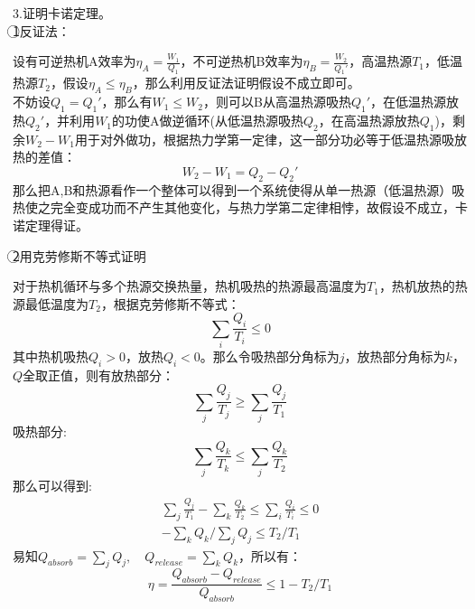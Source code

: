\documentclass[12pt]{article}
\begin{document}
\noindent
3.证明卡诺定理。\\
\textcircled{1}反证法：

 设有可逆热机A效率为$\eta_A=\frac{W_1}{Q_1}$，不可逆热机B效率为$\eta_B=\frac{W_2}{Q_1 '}$，高温热源$T_1$，低温热源$T_2$，假设$\eta_A \leq \eta_B$，那么利用反证法证明假设不成立即可。\\
不妨设$Q_1=Q_1 '$，那么有$W_1\leq W_2$，则可以B从高温热源吸热$Q_1 '$，在低温热源放热$Q_2 '$，并利用$W_1$的功使A做逆循环(从低温热源吸热$Q_2$，在高温热源放热$Q_1$)，剩余$W_2-W_1$用于对外做功，根据热力学第一定律，这一部分功必等于低温热源吸放热的差值：
\begin{equation}
	W_2-W_1=Q_2-Q_2'
\end{equation}
那么把A,B和热源看作一个整体可以得到一个系统使得从单一热源（低温热源）吸热使之完全变成功而不产生其他变化，与热力学第二定律相悖，故假设不成立，卡诺定理得证。

\noindent
\textcircled{2}用克劳修斯不等式证明

对于热机循环与多个热源交换热量，热机吸热的热源最高温度为$T_1$，热机放热的热源最低温度为$T_2$，根据克劳修斯不等式：
\begin{equation}
	\underset{i}{\sum}\frac{Q_i}{T_i}\le 0
\end{equation}
其中热机吸热$Q_i>0$，放热$Q_i<0$。那么令吸热部分角标为$j$，放热部分角标为$k$，$Q$全取正值，则有放热部分：
\begin{equation}
	\underset{j}{\sum}\frac{Q_j}{T_j}\ge \underset{j}{\sum}\frac{Q_j}{T_1}
\end{equation}
吸热部分:
\begin{equation}
		\underset{j}{\sum}\frac{Q_k}{T_k}\le \underset{j}{\sum}\frac{Q_k}{T_2}
\end{equation}
那么可以得到:
\begin{equation}
	\begin{split}
\underset{j}{\sum}\frac{Q_j}{T_1}-\underset{k}{\sum}\frac{Q_k}{T_2}\leq 	\underset{i}{\sum}\frac{Q_i}{T_i} \le 0 \\
-\underset{k}{\sum}{Q_k}/\underset{j}{\sum}{Q_j}\le T_2/T_1
\end{split}
\end{equation}
易知$Q_{absorb}=\underset{j}{\sum}{Q_j},\quad  Q_{release}=\underset{k}{\sum}{Q_k}$，所以有：
\begin{equation}
	\eta=\frac{Q_{absorb}-Q_{release}}{Q_{absorb}}\le 1-T_2/T_1
\end{equation}
\end{document}
